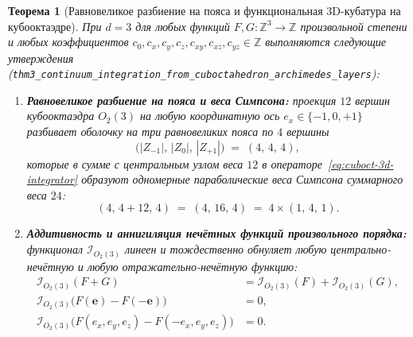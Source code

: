 \documentclass[11pt,a4paper]{article}
\theoremstyle{plain}
\newtheorem{theorem}{Теорема}[section]
\theoremstyle{definition}
\begin{document}
\begin{theorem}[Равновеликое разбиение на пояса и функциональная 3D-кубатура на кубооктаэдре]
\label{thm:main-3}
При $d = 3$ для любых функций $F, G\colon \mathbb{Z}^3 \to \mathbb{Z}$ произвольной степени и любых коэффициентов $c_0, c_x, c_y, c_z, c_{xy}, c_{xz}, c_{yz} \in \mathbb{Z}$ выполняются следующие утверждения (\texttt{thm3\_continuum\_integration\_from\_cuboctahedron\_archimedes\_layers}):
\begin{enumerate}[label=\textbf{(\roman*)},leftmargin=*]
\item \textbf{Равновеликое разбиение на пояса и веса Симпсона:}
  проекция $12$ вершин кубооктаэдра $O_2(3)$ на любую координатную ось $e_x \in \{-1, 0, +1\}$ разбивает оболочку на три равновеликих пояса по $4$ вершины
  \begin{equation}
    \label{eq:equizonal-444}
    \bigl(|Z_{-1}|,\, |Z_0|,\, |Z_{+1}|\bigr) \;=\; (4,\, 4,\, 4),
  \end{equation}
  которые в сумме с центральным узлом веса $12$ в операторе~\eqref{eq:cuboct-3d-integrator} образуют одномерные параболические веса Симпсона суммарного веса $24$:
  \begin{equation}
    \label{eq:simpson-weights-4-16-4}
    (4,\, 4 + 12,\, 4) \;=\; (4,\, 16,\, 4) \;=\; 4\times(1,\, 4,\, 1).
  \end{equation}

\item \textbf{Аддитивность и аннигиляция нечётных функций произвольного порядка:}
  функционал $\mathcal{I}_{O_2(3)}$ линеен и тождественно обнуляет любую центрально-нечётную и любую отражательно-нечётную функцию:
  \begin{align}
    \mathcal{I}_{O_2(3)}(F + G) &= \mathcal{I}_{O_2(3)}(F) + \mathcal{I}_{O_2(3)}(G), \label{eq:functional-additivity} \\
    \mathcal{I}_{O_2(3)}\bigl(F(\mathbf{e}) - F(-\mathbf{e})\bigr) &= 0, \label{eq:functional-central-odd} \\
    \mathcal{I}_{O_2(3)}\bigl(F(e_x, e_y, e_z) - F(-e_x, e_y, e_z)\bigr) &= 0. \label{eq:functional-axis-odd}
  \end{align}


\end{enumerate}
\end{theorem}
\end{document}
